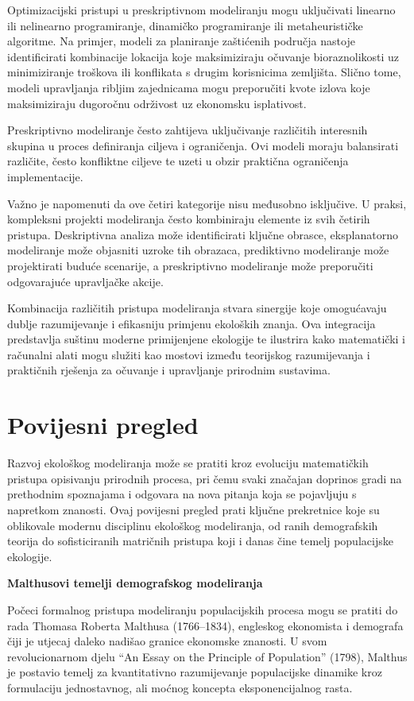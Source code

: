 \documentclass[11pt,oneside]{book}
\begin{document}
Optimizacijski pristupi u preskriptivnom modeliranju mogu uključivati linearno ili nelinearno programiranje, dinamičko programiranje ili metaheurističke algoritme. Na primjer, modeli za planiranje zaštićenih područja nastoje identificirati kombinacije lokacija koje maksimiziraju očuvanje bioraznolikosti uz minimiziranje troškova ili konflikata s drugim korisnicima zemljišta. Slično tome, modeli upravljanja ribljim zajednicama mogu preporučiti kvote izlova koje maksimiziraju dugoročnu održivost uz ekonomsku isplativost.

Preskriptivno modeliranje često zahtijeva uključivanje različitih interesnih skupina u proces definiranja ciljeva i ograničenja. Ovi modeli moraju balansirati različite, često konfliktne ciljeve te uzeti u obzir praktična ograničenja implementacije.

Važno je napomenuti da ove četiri kategorije nisu međusobno isključive. U praksi, kompleksni projekti modeliranja često kombiniraju elemente iz svih četirih pristupa. Deskriptivna analiza može identificirati ključne obrasce, eksplanatorno modeliranje može objasniti uzroke tih obrazaca, prediktivno modeliranje može projektirati buduće scenarije, a preskriptivno modeliranje može preporučiti odgovarajuće upravljačke akcije.

Kombinacija različitih pristupa modeliranja stvara sinergije koje omogućavaju dublje razumijevanje i efikasniju primjenu ekoloških znanja. Ova integracija predstavlja suštinu moderne primijenjene ekologije te ilustrira kako matematički i računalni alati mogu služiti kao mostovi između teorijskog razumijevanja i praktičnih rješenja za očuvanje i upravljanje prirodnim sustavima.
\section{Povijesni pregled}

Razvoj ekološkog modeliranja može se pratiti kroz evoluciju matematičkih pristupa opisivanju prirodnih procesa, pri čemu svaki značajan doprinos gradi na prethodnim spoznajama i odgovara na nova pitanja koja se pojavljuju s napretkom znanosti. Ovaj povijesni pregled prati ključne prekretnice koje su oblikovale modernu disciplinu ekološkog modeliranja, od ranih demografskih teorija do sofisticiranih matričnih pristupa koji i danas čine temelj populacijske ekologije.

\textbf{Malthusovi temelji demografskog modeliranja}

Počeci formalnog pristupa modeliranju populacijskih procesa mogu se pratiti do rada Thomasa Roberta Malthusa (1766--1834), engleskog ekonomista i demografa čiji je utjecaj daleko nadišao granice ekonomske znanosti. U svom revolucionarnom djelu ``An Essay on the Principle of Population'' (1798), Malthus je postavio temelj za kvantitativno razumijevanje populacijske dinamike kroz formulaciju jednostavnog, ali moćnog koncepta eksponencijalnog rasta.
\end{document}
